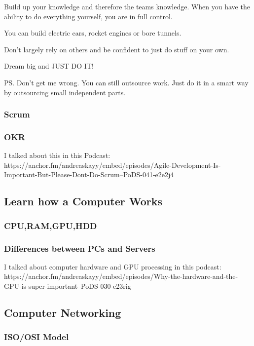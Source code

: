 \documentclass[12pt]{scrartcl} %
\begin{document}
Build up your knowledge and therefore the teams knowledge. When you have the ability to do everything yourself, you are in full control.
		
You can build electric cars, rocket engines or bore tunnels.

Don’t largely rely on others and be confident to just do stuff on your own.

Dream big and JUST DO IT!

PS. Don’t get me wrong. You can still outsource work. Just do it in a smart way by outsourcing small independent parts.

\subsubsection{Scrum}

\subsubsection{OKR}

I talked about this in this Podcast: https://anchor.fm/andreaskayy/embed/episodes/Agile-Development-Is-Important-But-Please-Dont-Do-Scrum--PoDS-041-e2e2j4
 
 \subsection{Learn how a Computer Works}
 
\subsubsection{CPU,RAM,GPU,HDD}

\subsubsection{Differences between PCs and Servers}

I talked about computer hardware and GPU processing in this podcast: https://anchor.fm/andreaskayy/embed/episodes/Why-the-hardware-and-the-GPU-is-super-important--PoDS-030-e23rig
 
\subsection{Computer Networking}

\subsubsection{ISO/OSI Model}
\end{document}
